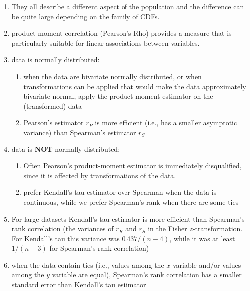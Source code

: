 \begin{customTableWrapper}{1}
\begin{enumerate}
    \item They all describe a different aspect of the population and the difference can be quite large depending on the family of CDFs.

    \item product-moment correlation (Pearson’s Rho) provides a measure that is particularly suitable for linear associations between variables.

    \item data is normally distributed:
    \begin{enumerate}
        \item when the data are bivariate normally distributed, or when transformations can be applied that would make the data approximately bivariate normal, apply the product-moment estimator on the (transformed) data

        \item Pearson’s estimator $r_P$ is more efficient (i.e., has a smaller asymptotic variance) than Spearman’s estimator $r_S$
    \end{enumerate}

    \item data is \textbf{NOT} normally distributed:
    \begin{enumerate}
        \item Often Pearson’s product-moment estimator is immediately disqualified, since it is affected by transformations of the data. 

        \item prefer Kendall’s tau estimator over Spearman when the data is continuous, while we prefer Spearman’s rank when there are some ties
    \end{enumerate}

    \item For large datasets Kendall’s tau estimator is more efficient than Spearman’s rank correlation (the variances of $r_K$ and $r_S$ in the Fisher $z$-transformation. For Kendall’s tau this variance was $0.437/(n - 4)$, while it was at least $1/(n - 3)$ for Spearman’s rank correlation)

    \item when the data contain ties (i.e., values among the $x$ variable and/or values among the $y$ variable are equal), Spearman’s rank correlation has a smaller standard error than Kendall’s tau estimator

\end{enumerate}
\end{customTableWrapper}



